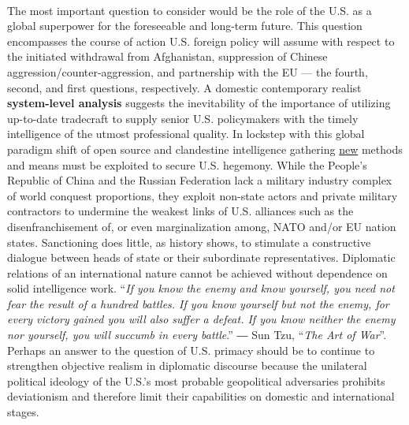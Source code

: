 \documentclass[12pt]{article}
\begin{document}
\begin{justify}
  \paragraph{} The most important question to consider would be the role of the U.S. as a global superpower for the foreseeable and long-term future. This question encompasses the course of action U.S. foreign policy will assume with respect to the initiated withdrawal from Afghanistan, suppression of Chinese aggression/counter-aggression, and partnership with the EU — the fourth, second, and first questions, respectively. A domestic contemporary realist \textbf{system-level analysis} suggests the inevitability of the importance of utilizing up-to-date tradecraft to supply senior U.S. policymakers with the timely intelligence of the utmost professional quality. In lockstep with this global paradigm shift of open source and clandestine intelligence gathering \href{https://www.newsweek.com/exclusive-inside-militarys-secret-undercover-army-1591881}{new} methods and means must be exploited to secure U.S. hegemony. While the People's Republic of China and the Russian Federation lack a military industry complex of world conquest proportions, they exploit non-state actors and private military contractors to undermine the weakest links of U.S. alliances such as the disenfranchisement of, or even marginalization among, NATO and/or EU nation states. Sanctioning does little, as history shows, to stimulate a constructive dialogue between heads of state or their subordinate representatives. Diplomatic relations of an international nature cannot be achieved without dependence on solid intelligence work. “\emph{If you know the enemy and know yourself, you need not fear the result of a hundred battles. If you know yourself but not the enemy, for every victory gained you will also suffer a defeat. If you know neither the enemy nor yourself, you will succumb in every battle}.” ― Sun Tzu, “\emph{The Art of War}”. Perhaps an answer to the question of U.S. primacy should be to continue to strengthen objective realism in diplomatic discourse because the unilateral political ideology of the U.S.'s most probable geopolitical adversaries prohibits deviationism and therefore limit their capabilities on domestic and international stages.  
\end{justify}
\end{document}
